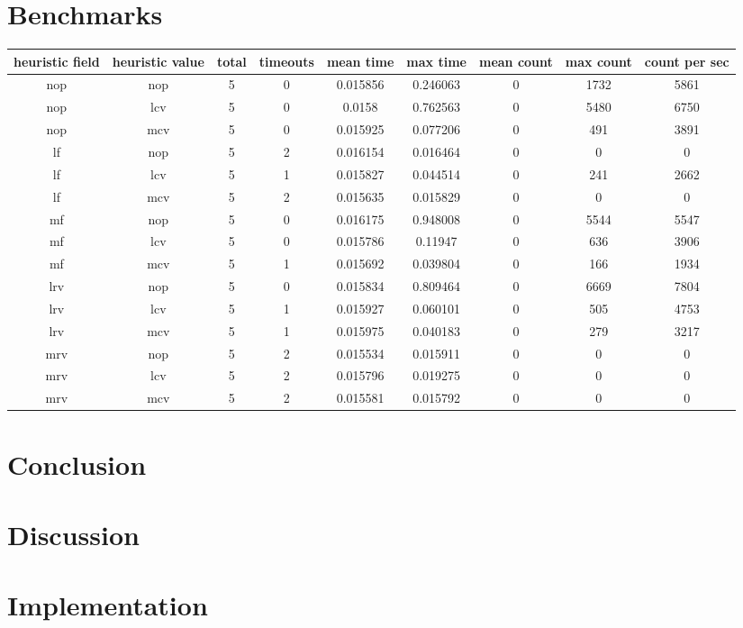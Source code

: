 \documentclass[a4paper]{article}
\begin{document}
\section{Benchmarks}
\begin{table}[h]
	\begin{adjustbox}{center}
	\begin{tabular}{|c|c|c|c|c|c|c|c|c|}\hline
		\textbf{heuristic field} & \textbf{heuristic value} & \textbf{total} & \textbf{timeouts} & \textbf{mean time} & \textbf{max time} & \textbf{mean count} & \textbf{max count} & \textbf{count per sec} \\\hline
		nop & nop & 5 & 0 & 0.015856 & 0.246063 & 0 & 1732 & 5861 \\\hline
		nop & lcv & 5 & 0 & 0.0158 & 0.762563 & 0 & 5480 & 6750 \\\hline
		nop & mcv & 5 & 0 & 0.015925 & 0.077206 & 0 & 491 & 3891 \\\hline
		lf & nop & 5 & 2 & 0.016154 & 0.016464 & 0 & 0 & 0 \\\hline
		lf & lcv & 5 & 1 & 0.015827 & 0.044514 & 0 & 241 & 2662 \\\hline
		lf & mcv & 5 & 2 & 0.015635 & 0.015829 & 0 & 0 & 0 \\\hline
		mf & nop & 5 & 0 & 0.016175 & 0.948008 & 0 & 5544 & 5547 \\\hline
		mf & lcv & 5 & 0 & 0.015786 & 0.11947 & 0 & 636 & 3906 \\\hline
		mf & mcv & 5 & 1 & 0.015692 & 0.039804 & 0 & 166 & 1934 \\\hline
		lrv & nop & 5 & 0 & 0.015834 & 0.809464 & 0 & 6669 & 7804 \\\hline
		lrv & lcv & 5 & 1 & 0.015927 & 0.060101 & 0 & 505 & 4753 \\\hline
		lrv & mcv & 5 & 1 & 0.015975 & 0.040183 & 0 & 279 & 3217 \\\hline
		mrv & nop & 5 & 2 & 0.015534 & 0.015911 & 0 & 0 & 0 \\\hline
		mrv & lcv & 5 & 2 & 0.015796 & 0.019275 & 0 & 0 & 0 \\\hline
		mrv & mcv & 5 & 2 & 0.015581 & 0.015792 & 0 & 0 & 0 \\\hline
	\end{tabular}
	\end{adjustbox}
\end{table}

\section{Conclusion}

\section{Discussion}




\appendix
\section{Implementation}
\end{document}
